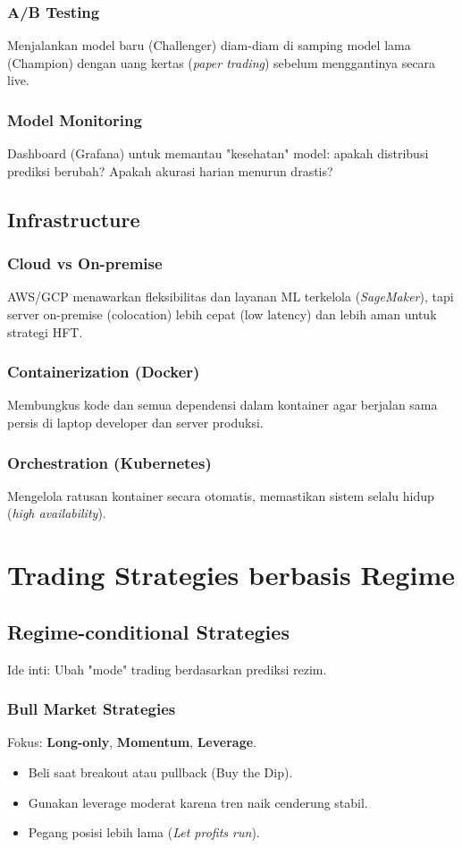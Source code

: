 \documentclass[12pt,a4paper]{book}
\begin{document}
\subsection{A/B Testing}
Menjalankan model baru (Challenger) diam-diam di samping model lama (Champion) dengan uang kertas (\textit{paper trading}) sebelum menggantinya secara live.

\subsection{Model Monitoring}
Dashboard (Grafana) untuk memantau "kesehatan" model: apakah distribusi prediksi berubah? Apakah akurasi harian menurun drastis?

\section{Infrastructure}
\subsection{Cloud vs On-premise}
AWS/GCP menawarkan fleksibilitas dan layanan ML terkelola (\textit{SageMaker}), tapi server on-premise (colocation) lebih cepat (low latency) dan lebih aman untuk strategi HFT.

\subsection{Containerization (Docker)}
Membungkus kode dan semua dependensi dalam kontainer agar berjalan sama persis di laptop developer dan server produksi.

\subsection{Orchestration (Kubernetes)}
Mengelola ratusan kontainer secara otomatis, memastikan sistem selalu hidup (\textit{high availability}).

\chapter{Trading Strategies berbasis Regime}
\section{Regime-conditional Strategies}
Ide inti: Ubah "mode" trading berdasarkan prediksi rezim.

\subsection{Bull Market Strategies}
Fokus: \textbf{Long-only}, \textbf{Momentum}, \textbf{Leverage}.
\begin{itemize}
    \item Beli saat breakout atau pullback (Buy the Dip).
    \item Gunakan leverage moderat karena tren naik cenderung stabil.
    \item Pegang posisi lebih lama (\textit{Let profits run}).
\end{itemize}
\end{document}
